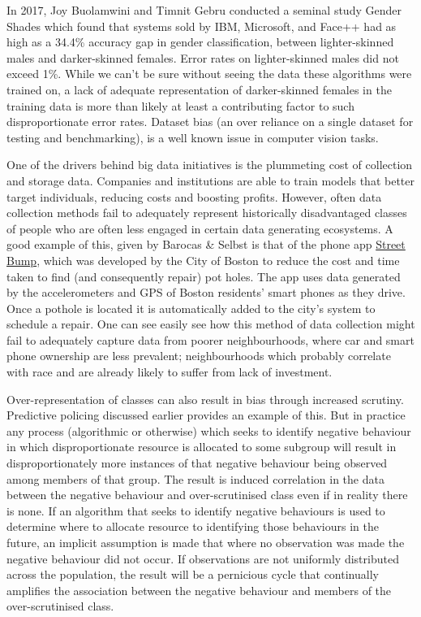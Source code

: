 In 2017, Joy Buolamwini and Timnit Gebru conducted a seminal study Gender Shades\cite{GenderShades} which found that systems sold by IBM, Microsoft, and Face++ had as high as a 34.4\% accuracy gap in gender classification, between lighter-skinned males and darker-skinned females. Error rates on lighter-skinned males did not exceed 1\%. While we can't be sure without seeing the data these algorithms were trained on, a lack of adequate representation of darker-skinned females in the training data is more than likely at least a contributing factor to such disproportionate error rates. Dataset bias (an over reliance on a single dataset for testing and benchmarking), is a well known issue in computer vision tasks.

One of the drivers behind big data initiatives is the plummeting cost of collection and storage data. Companies and institutions are able to train models that better target individuals, reducing costs and boosting profits. However, often data collection methods fail to adequately represent historically disadvantaged classes of people who are often less engaged in certain data generating ecosystems. A good example of this, given by Barocas \& Selbst\cite{BarocasSelbst} is that of the phone app \href{https://www.boston.gov/transportation/street-bump}{Street Bump}, which was developed by the City of Boston to reduce the cost and time taken to find (and consequently repair) pot holes. The app uses data generated by the accelerometers and GPS of Boston residents' smart phones as they drive. Once a pothole is located it is automatically added to the city's system to schedule a repair. One can see easily see how this method of data collection might fail to adequately capture data from poorer neighbourhoods, where car and smart phone ownership are less prevalent; neighbourhoods which probably correlate with race and are already likely to suffer from lack of investment.

Over-representation of classes can also result in bias through increased scrutiny. Predictive policing discussed earlier provides an example of this. But in practice any process (algorithmic or otherwise) which seeks to identify negative behaviour in which disproportionate resource is allocated to some subgroup will result in disproportionately more instances of that negative behaviour being observed among members of that group. The result is induced correlation in the data between the negative behaviour and over-scrutinised class even if in reality there is none. If an algorithm that seeks to identify negative behaviours is used to determine where to allocate resource to identifying those behaviours in the future, an implicit assumption is made that where no observation was made the negative behaviour did not occur. If observations are not uniformly distributed across the population, the result will be a pernicious cycle that continually amplifies the association between the negative behaviour and members of the over-scrutinised class.

